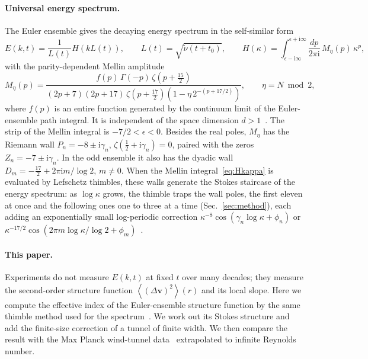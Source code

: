 \documentclass[aip,pof,preprint,floatfix,nofootinbib,amsmath,amssymb]{revtex4-2}
\def\I{\mathrm{i}}
\def\VEV#1{\left\langle #1 \right\rangle}
\newcommand{\vect}[1]{\boldsymbol{#1}}
\begin{document}
\paragraph*{Universal energy spectrum.}
The Euler ensemble gives the decaying energy spectrum in the self-similar form~\cite{migdal2024quantum, migdal2026Riemann}
\begin{equation}
    E(k,t)=\frac{1}{L(t)}H\left(kL(t)\right),\qquad L(t)=\sqrt{\tilde\nu(t+t_0)},\qquad
    H(\kappa)=\int_{\epsilon-\I\infty}^{\epsilon+\I\infty}\frac{dp}{2\pi\I}\,M_\eta(p)\,\kappa^{p},
    \label{eq:Hkappa}
\end{equation}
with the parity-dependent Mellin amplitude
\begin{equation}
    M_\eta(p)=\frac{f(p)\,\Gamma(-p)\,\zeta\!\left(p+\frac{15}{2}\right)}
    {(2p+7)(2p+17)\,\zeta\!\left(p+\frac{17}{2}\right)\left(1-\eta\,2^{-(p+17/2)}\right)},\qquad \eta=N\bmod 2 ,
    \label{eq:Mtheor}
\end{equation}
where $f(p)$ is an entire function generated by the continuum limit of the Euler-ensemble path integral. It is independent
of the space dimension $d>1$~\cite{ReviewPaperAM}. The strip of the Mellin integral is $-7/2<\epsilon<0$. Besides the real
poles, $M_\eta$ has the Riemann wall $P_n=-8\pm\I\gamma_n$, $\zeta(\tfrac12+\I\gamma_n)=0$, paired with the zeros
$Z_n=-7\pm\I\gamma_n$. In the odd ensemble it also has the dyadic wall
$D_m=-\tfrac{17}{2}+2\pi\I m/\log 2$, $m\neq0$. When the Mellin integral~\eqref{eq:Hkappa} is evaluated by Lefschetz
thimbles, these walls generate the Stokes staircase of the energy spectrum: as $\log\kappa$ grows, the thimble traps the wall
poles, the first eleven at once and the following ones one to three at a time (Sec.~\ref{sec:method}), each adding an
exponentially small log-periodic correction $\kappa^{-8}\cos(\gamma_n\log\kappa+\phi_n)$ or
$\kappa^{-17/2}\cos(2\pi m\log\kappa/\log 2+\phi_m)$~\cite{migdal2026Riemann}.

\paragraph*{This paper.}
Experiments do not measure $E(k,t)$ at fixed $t$ over many decades; they measure the second-order structure function
$\VEV{(\Delta\vect v)^2}(r)$ and its local slope. Here we compute the effective index of the Euler-ensemble structure function
by the same thimble method used for the spectrum~\cite{migdal2026Riemann}. We work out its Stokes structure and add the
finite-size correction of a tunnel of finite width. We then compare the result with the Max Planck wind-tunnel
data~\cite{GregXi2} extrapolated to infinite Reynolds number.
\end{document}
